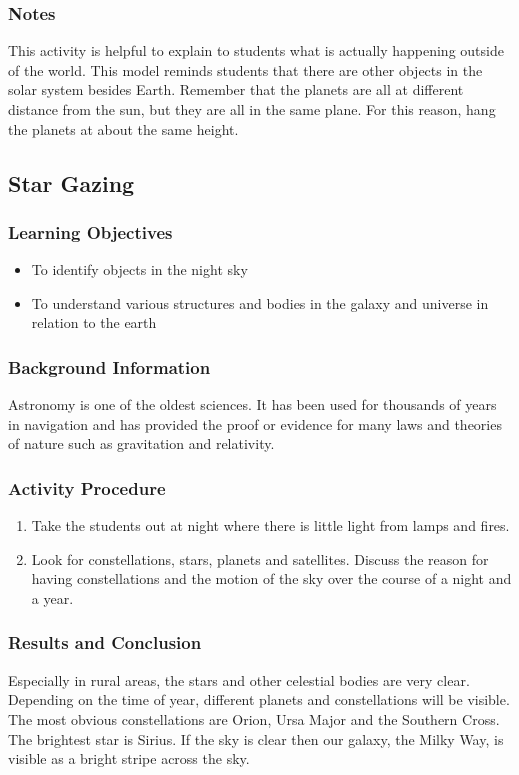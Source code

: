 \subsubsection*{Notes}
This activity is helpful to explain to students what is actually
happening outside of the world. This model reminds students that there are other objects in the solar system besides Earth. Remember that the planets are all at different distance from the sun, but they are all in the same plane. For this reason, hang the planets at about the same height.

\subsection{Star Gazing}

\subsubsection*{Learning Objectives}
\begin{itemize}
\item{To identify objects in the night sky}
\item{To understand various structures and bodies in the galaxy and universe in relation to the earth}
\end{itemize}

\subsubsection*{Background Information}
Astronomy is one of the oldest sciences. It has been used for thousands of years in navigation and has provided the proof or evidence for many laws and theories of nature such as gravitation and relativity.

\subsubsection*{Activity Procedure}
\begin{enumerate}
\item{Take the students out at night where there is little light from lamps and fires.}
\item{Look for constellations, stars, planets and satellites. Discuss the reason for having constellations and the motion of the sky over the course of a night and a year.}
\end{enumerate}

\subsubsection*{Results and Conclusion}
Especially in rural areas, the stars and other celestial bodies are very clear. Depending on the time of year, different planets and constellations will be visible. The most obvious constellations are Orion, Ursa Major and the Southern Cross. The brightest star is Sirius. If the sky is clear then our galaxy, the Milky Way, is visible as a bright stripe across the sky.


